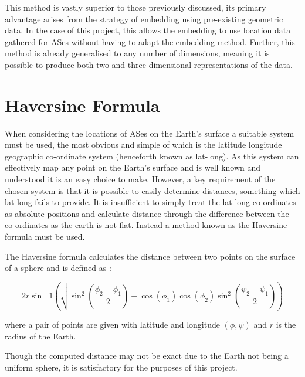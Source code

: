 This method is vastly superior to those previously discussed, its primary advantage arises from the strategy of embedding using pre-existing geometric data. In the case of this project, this allows the embedding to use location data gathered for ASes without having to adapt the embedding method. Further, this method is already generalised to any number of dimensions, meaning it is possible to produce both two and three dimensional representations of the data. 

\section{Haversine Formula}
\label{sec:haversine}
When considering the locations of ASes on the Earth's surface a suitable system must be used, the most obvious and simple of which is the latitude longitude geographic co-ordinate system (henceforth known as lat-long). As this system can effectively map any point on the Earth's surface and is well known and understood it is an easy choice to make. However, a key requirement of the chosen system is that it is possible to easily determine distances, something which lat-long fails to provide. It is insufficient to simply treat the lat-long co-ordinates as absolute positions and calculate distance through the difference between the co-ordinates as the earth is not flat. Instead a method known as the Haversine formula must be used.

The Haversine formula calculates the distance between two points on the surface of a sphere and is defined as \cite{chopde_landmark_2013}:

\begin{equation}
\label{haversine_formula}
2r\sin^-1\left(\sqrt{\sin^2\left(\frac{\phi_2 - \phi_1}{2}\right) + \cos(\phi_1) \cos(\phi_2) \sin^2\left(\frac{\psi_2 - \psi_1}{2}\right)}\right)
\end{equation}

where a pair of points are given with latitude and longitude $(\phi,\psi)$ and $r$ is the radius of the Earth. 

Though the computed distance may not be exact due to the Earth not being a uniform sphere, it is satisfactory for the purposes of this project.
